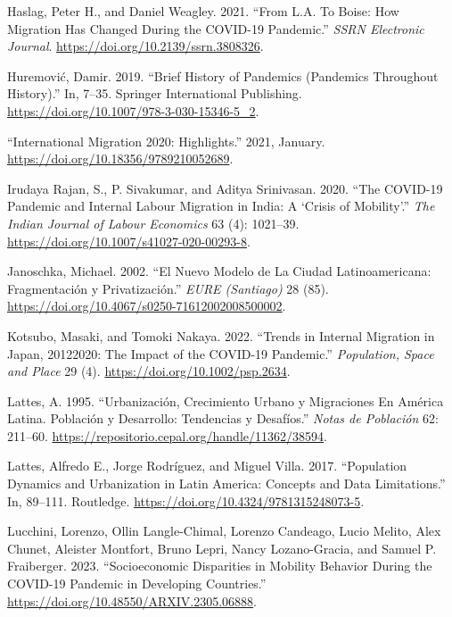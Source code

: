 \documentclass[11pt,letterpaper]{article}
\newlength{\cslhangindent}
\newlength{\cslentryspacingunit} %
\newenvironment{CSLReferences}[2] %
 {%
  \setlength{\parindent}{0pt}
  \ifodd #1
  \let\oldpar\par
  \def\par{\hangindent=\cslhangindent\oldpar}
  \fi
  \setlength{\parskip}{#2\cslentryspacingunit}
 }%
 {}
\begin{document}
\begin{CSLReferences}{1}{0}
Haslag, Peter H., and Daniel Weagley. 2021. {``From L.A. To Boise: How
Migration Has Changed During the COVID-19 Pandemic.''} \emph{SSRN
Electronic Journal}. \url{https://doi.org/10.2139/ssrn.3808326}.

Huremović, Damir. 2019. {``Brief History of Pandemics (Pandemics
Throughout History).''} In, 7--35. Springer International Publishing.
\url{https://doi.org/10.1007/978-3-030-15346-5_2}.

{``International Migration 2020: Highlights.''} 2021, January.
\url{https://doi.org/10.18356/9789210052689}.

Irudaya Rajan, S., P. Sivakumar, and Aditya Srinivasan. 2020. {``The
COVID-19 Pandemic and Internal Labour Migration in India: A {`}Crisis of
Mobility{'}.''} \emph{The Indian Journal of Labour Economics} 63 (4):
1021--39. \url{https://doi.org/10.1007/s41027-020-00293-8}.

Janoschka, Michael. 2002. {``El Nuevo Modelo de La Ciudad
Latinoamericana: Fragmentación y Privatización.''} \emph{EURE
(Santiago)} 28 (85).
\url{https://doi.org/10.4067/s0250-71612002008500002}.

Kotsubo, Masaki, and Tomoki Nakaya. 2022. {``Trends in Internal
Migration in Japan, 2012{\textendash}2020: The Impact of the COVID{-}19
Pandemic.''} \emph{Population, Space and Place} 29 (4).
\url{https://doi.org/10.1002/psp.2634}.

Lattes, A. 1995. {``Urbanización, Crecimiento Urbano y Migraciones En
América Latina. Población y Desarrollo: Tendencias y Desafíos.''}
\emph{Notas de Población} 62: 211--60.
\url{https://repositorio.cepal.org/handle/11362/38594}.

Lattes, Alfredo E., Jorge Rodríguez, and Miguel Villa. 2017.
{``Population Dynamics and Urbanization in Latin America: Concepts and
Data Limitations.''} In, 89--111. Routledge.
\url{https://doi.org/10.4324/9781315248073-5}.

Lucchini, Lorenzo, Ollin Langle-Chimal, Lorenzo Candeago, Lucio Melito,
Alex Chunet, Aleister Montfort, Bruno Lepri, Nancy Lozano-Gracia, and
Samuel P. Fraiberger. 2023. {``Socioeconomic Disparities in Mobility
Behavior During the COVID-19 Pandemic in Developing Countries.''}
\url{https://doi.org/10.48550/ARXIV.2305.06888}.


\end{CSLReferences}
\end{document}

